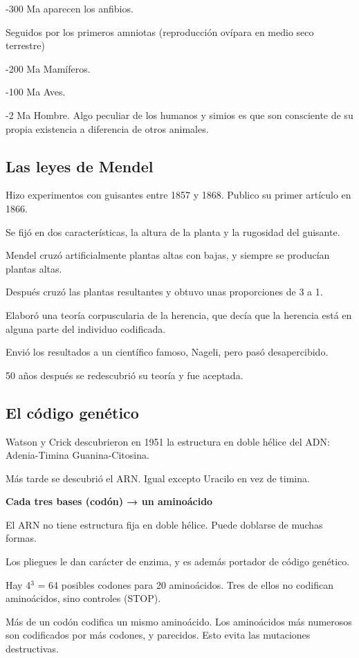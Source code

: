 \documentclass[12pt, twoside, openright]{report} %
\begin{document}
-300 Ma aparecen los anfibios.

Seguidos por los primeros amniotas (reproducción ovípara en medio seco terrestre)

-200 Ma Mamíferos.

-100 Ma Aves.

-2 Ma Hombre. Algo peculiar de los humanos y simios es que son consciente de su propia existencia a diferencia de otros animales.

\subsection{Las leyes de Mendel}
Hizo experimentos con guisantes entre 1857 y 1868. Publico su primer artículo en 1866.

Se fijó en dos características, la altura de la planta y la rugosidad del guisante.

Mendel cruzó artificialmente plantas altas con bajas, y siempre se producían plantas altas.

Después cruzó las plantas resultantes y obtuvo unas proporciones de 3 a 1.

Elaboró una teoría corpuscularia de la herencia, que decía que la herencia está en alguna parte del individuo codificada.

Envió los resultados a un científico famoso, Nageli, pero pasó desapercibido.

50 años después se redescubrió su teoría y fue aceptada.

\subsection{El código genético}
Watson y Crick descubrieron en 1951 la estructura en doble hélice del ADN: Adenia-Timina Guanina-Citosina.

Más tarde se descubrió el ARN. Igual excepto Uracilo en vez de timina.

\textbf{Cada tres bases (codón) → un aminoácido}

El ARN no tiene estructura fija en doble hélice. Puede doblarse de muchas formas.

Los pliegues le dan carácter de enzima, y es además portador de código genético.

Hay 4$^3$ = 64 posibles codones para 20 aminoácidos. Tres de ellos no codifican aminoácidos, sino controles (STOP).

Más de un codón codifica un mismo aminoácido. Los aminoácidos más numerosos son codificados por más codones, y parecidos. Esto evita las mutaciones destructivas.
\end{document}
